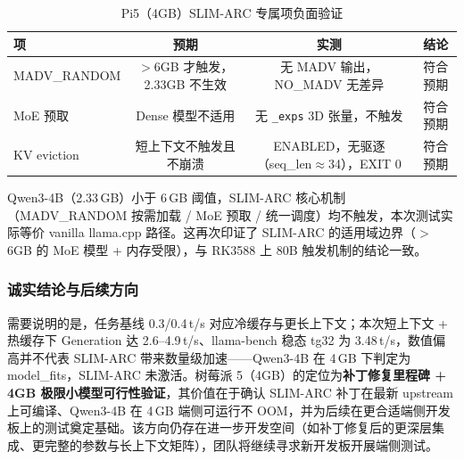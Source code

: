 \begin{table}[H]
    \centering
    \caption{Pi5（4GB）SLIM-ARC 专属项负面验证}
    \label{tab:pi5_neg}
    \begin{tabular}{lccc}
        \toprule
        \textbf{项} & \textbf{预期} & \textbf{实测} & \textbf{结论} \\
        \midrule
        MADV\_RANDOM & $>$6GB 才触发，2.33GB 不生效 & 无 MADV 输出，NO\_MADV 无差异 & 符合预期 \\
        MoE 预取 & Dense 模型不适用 & 无 \texttt{\_exps} 3D 张量，不触发 & 符合预期 \\
        KV eviction & 短上下文不触发且不崩溃 & ENABLED，无驱逐（seq\_len$\approx$34），EXIT 0 & 符合预期 \\
        \bottomrule
    \end{tabular}
\end{table}

Qwen3-4B（2.33\,GB）小于 6\,GB 阈值，SLIM-ARC 核心机制（MADV\_RANDOM 按需加载 / MoE 预取 / 统一调度）均不触发，本次测试实际等价 vanilla llama.cpp 路径。这再次印证了 SLIM-ARC 的适用域边界（$>$6GB 的 MoE 模型 + 内存受限），与 RK3588 上 80B 触发机制的结论一致。

\subsubsection{诚实结论与后续方向}

需要说明的是，任务基线 0.3/0.4\,t/s 对应冷缓存与更长上下文；本次短上下文 + 热缓存下 Generation 达 2.6--4.9\,t/s、llama-bench 稳态 tg32 为 3.48\,t/s，数值偏高并不代表 SLIM-ARC 带来数量级加速——Qwen3-4B 在 4\,GB 下判定为 model\_fits，SLIM-ARC 未激活。树莓派 5（4GB）的定位为\textbf{补丁修复里程碑 + 4GB 极限小模型可行性验证}，其价值在于确认 SLIM-ARC 补丁在最新 upstream 上可编译、Qwen3-4B 在 4\,GB 端侧可运行不 OOM，并为后续在更合适端侧开发板上的测试奠定基础。该方向仍存在进一步开发空间（如补丁修复后的更深层集成、更完整的参数与长上下文矩阵），团队将继续寻求新开发板开展端侧测试。
